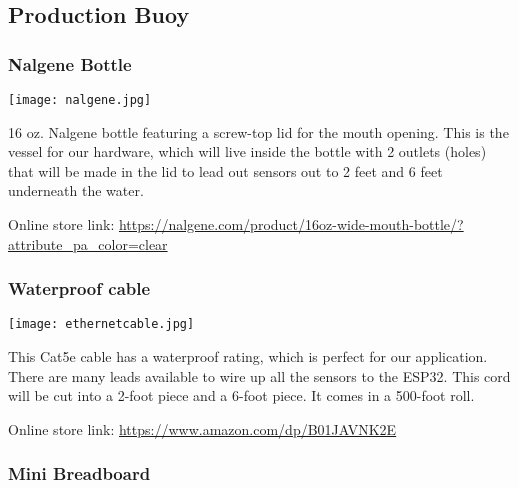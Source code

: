 \subsection{Production Buoy}

\hypertarget{nalgene}{}
\subsubsection{Nalgene Bottle}

\hspace{2em}
\texttt{[image: nalgene.jpg]}

\begin{flushleft}
    16 oz. Nalgene bottle featuring a screw-top lid for the mouth opening. 
    This is the vessel for our hardware, which will live inside the bottle 
    with 2 outlets (holes) that will be made in the lid to lead out sensors 
    out to 2 feet and 6 feet underneath the water.
    \newline

    Online store link: \newline
    \footnotesize\url{https://nalgene.com/product/16oz-wide-mouth-bottle/?attribute_pa_color=clear}

\end{flushleft}

\hypertarget{cable}{}
\subsubsection{Waterproof cable}

\hspace{2em}
\texttt{[image: ethernetcable.jpg]}

\begin{flushleft}
    This Cat5e cable has a waterproof rating, which is perfect for our 
    application. There are many leads available to wire up all the sensors to 
    the ESP32. This cord will be cut into a 2-foot piece and a 6-foot piece.
    It comes in a 500-foot roll.
    \newline

    Online store link: \newline
    \footnotesize\url{https://www.amazon.com/dp/B01JAVNK2E}

\end{flushleft}

\hypertarget{minibread}{}
\subsubsection{Mini Breadboard}

